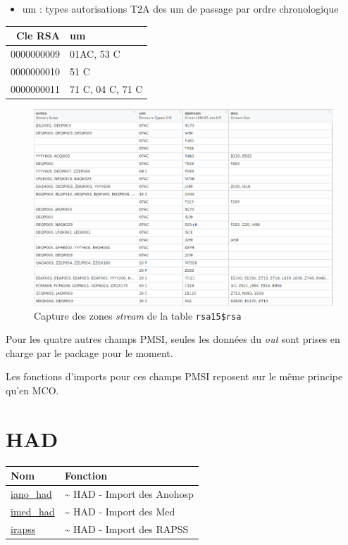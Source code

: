 \documentclass[]{book}
\providecommand{\tightlist}{%
  \setlength{\itemsep}{0pt}\setlength{\parskip}{0pt}}
\begin{document}
\begin{itemize}
\tightlist
\item
  um : types autorisations T2A des um de passage par ordre chronologique
\end{itemize}

\begin{longtable}[]{@{}rl@{}}
\toprule
Cle RSA & um\tabularnewline
\midrule
\endhead
0000000009 & 01AC, 53 C\tabularnewline
0000000010 & 51 C\tabularnewline
0000000011 & 71 C, 04 C, 71 C\tabularnewline
\bottomrule
\end{longtable}

\begin{figure}[htbp]
\centering
\includegraphics{images/rsa_stream.png}
\caption{Capture des zones \emph{stream} de la table
\texttt{rsa15\$rsa}}
\end{figure}

Pour les quatre autres champs PMSI, seules les données du \emph{out}
sont prises en charge par le package pour le moment.

Les fonctions d'imports pour ces champs PMSI reposent sur le même
principe qu'en MCO.

\section{HAD}\label{had}

\begin{longtable}[]{@{}ll@{}}
\toprule
Nom & Fonction\tabularnewline
\midrule
\endhead
\href{https://github.com/IM-APHP/pmeasyr/tree/master/Rd_md/iano_had.Rmd}{iano\_had}
& \textasciitilde{} HAD - Import des Anohosp\tabularnewline
\href{https://github.com/IM-APHP/pmeasyr/tree/master/Rd_md/imed_had.Rmd}{imed\_had}
& \textasciitilde{} HAD - Import des Med\tabularnewline
\href{https://github.com/IM-APHP/pmeasyr/tree/master/Rd_md/irapss.Rmd}{irapss}
& \textasciitilde{} HAD - Import des RAPSS\tabularnewline
\bottomrule
\end{longtable}
\end{document}
